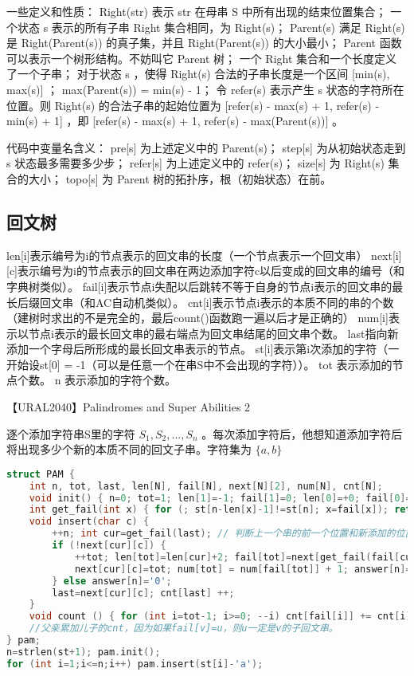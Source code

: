 \documentclass[landscape,a4paper]{article}
\begin{document}
一些定义和性质：
 Right(str) 表示 str 在母串 S 中所有出现的结束位置集合；
 一个状态 s 表示的所有子串 Right 集合相同，为 Right(s)；
 Parent(s) 满足 Right(s) 是 Right(Parent(s)) 的真子集，并且 Right(Parent(s)) 的大小最小；
 Parent 函数可以表示一个树形结构。不妨叫它 Parent 树；
 一个 Right 集合和一个长度定义了一个子串；
 对于状态 s ，使得 Right(s) 合法的子串长度是一个区间 [min(s), max(s)] ；
 max(Parent(s)) = min(s) - 1；
 令 refer(s) 表示产生 s 状态的字符所在位置。则 Right(s) 的合法子串的起始位置为 [refer(s) - max(s) + 1, refer(s) - min(s) + 1] ，即 [refer(s) - max(s) + 1, refer(s) - max(Parent(s))] 。

代码中变量名含义：
 pre[s] 为上述定义中的 Parent(s)；
 step[s] 为从初始状态走到 s 状态最多需要多少步；
 refer[s] 为上述定义中的 refer(s)；
 size[s] 为 Right(s) 集合的大小；
 topo[s] 为 Parent 树的拓扑序，根（初始状态）在前。

\subsection{回文树}

 len[i]表示编号为i的节点表示的回文串的长度（一个节点表示一个回文串）
 next[i][c]表示编号为i的节点表示的回文串在两边添加字符c以后变成的回文串的编号（和字典树类似）。
 fail[i]表示节点i失配以后跳转不等于自身的节点i表示的回文串的最长后缀回文串（和AC自动机类似）。
 cnt[i]表示节点i表示的本质不同的串的个数（建树时求出的不是完全的，最后count()函数跑一遍以后才是正确的）
 num[i]表示以节点i表示的最长回文串的最右端点为回文串结尾的回文串个数。
 last指向新添加一个字母后所形成的最长回文串表示的节点。
 st[i]表示第i次添加的字符（一开始设st[0] = -1（可以是任意一个在串S中不会出现的字符））。
 tot 表示添加的节点个数。
 n 表示添加的字符个数。

【URAL2040】Palindromes and Super Abilities 2

逐个添加字符串S里的字符 $S_1, S_2, ..., S_n$ 。每次添加字符后，他想知道添加字符后将出现多少个新的本质不同的回文子串。字符集为 $\{a, b\}$

\begin{lstlisting}[language=C++]
struct PAM {
	int n, tot, last, len[N], fail[N], next[N][2], num[N], cnt[N];
	void init() { n=0; tot=1; len[1]=-1; fail[1]=0; len[0]=+0; fail[0]=1; last=1; }
	int get_fail(int x) { for (; st[n-len[x]-1]!=st[n]; x=fail[x]); return x; }
	void insert(char c) {
		++n; int cur=get_fail(last); // 判断上一个串的前一个位置和新添加的位置是否相同，相同则说明构成回文。否则找 fail 指针。
		if (!next[cur][c]) {
			++tot; len[tot]=len[cur]+2; fail[tot]=next[get_fail(fail[cur])][c];
			next[cur][c]=tot; num[tot] = num[fail[tot]] + 1; answer[n]='1';
		} else answer[n]='0';
		last=next[cur][c]; cnt[last] ++;
	}
	void count () { for (int i=tot-1; i>=0; --i) cnt[fail[i]] += cnt[i]; }
	//父亲累加儿子的cnt，因为如果fail[v]=u，则u一定是v的子回文串。
} pam;
n=strlen(st+1); pam.init();
for (int i=1;i<=n;i++) pam.insert(st[i]-'a');
\end{lstlisting}
\end{document}
